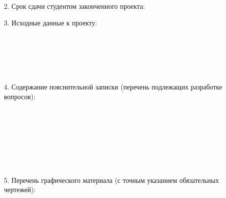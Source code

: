 {  \vspace{1em}

  2. Срок сдачи студентом законченного проекта: \underline{\hspace*{5em}}

  \vspace{1em}

  3. Исходные данные к проекту:\\
\uline{\hfill}\\
\uline{\hfill}\\
\uline{\hfill}\\
\uline{\hfill}\\
\uline{\hfill}\\

  \vspace{1em}

  4. Содержание пояснительной записки (перечень подлежащих разработке вопросов):
  \lineunderscore\\
  \lineunderscore\\
  \lineunderscore\\
  \lineunderscore\\
  \lineunderscore\\
  \lineunderscore\\
  \lineunderscore\\
  \lineunderscore\\


  \clearpage
  \thispagestyle{empty}

  5. Перечень графического материала (с точным указанием обязательных чертежей):
  \lineunderscore\\
  \lineunderscore\\
  \lineunderscore\\
  \lineunderscore\\
  \lineunderscore\\
  \lineunderscore\\


}
